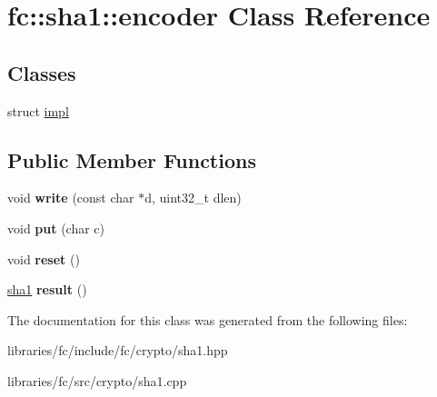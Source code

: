 \hypertarget{classfc_1_1sha1_1_1encoder}{}\section{fc\+:\+:sha1\+:\+:encoder Class Reference}
\label{classfc_1_1sha1_1_1encoder}
\subsection*{Classes}
\begin{DoxyCompactItemize}
\item 
struct \mbox{\hyperlink{structfc_1_1sha1_1_1encoder_1_1impl}{impl}}
\end{DoxyCompactItemize}
\subsection*{Public Member Functions}
\begin{DoxyCompactItemize}
\item 
\mbox{\label{classfc_1_1sha1_1_1encoder_a3fe2406bfa6f78ce37482c742a697601}} 
void {\bfseries write} (const char $\ast$d, uint32\+\_\+t dlen)
\item 
\mbox{\label{classfc_1_1sha1_1_1encoder_a6f1fc5ccfa1c4f484f0bf2edeaa027b2}} 
void {\bfseries put} (char c)
\item 
\mbox{\label{classfc_1_1sha1_1_1encoder_a22e2c6649fae5316337ccd1836779aaf}} 
void {\bfseries reset} ()
\item 
\mbox{\label{classfc_1_1sha1_1_1encoder_ad17eb3cf6315b803ba7d73edd704d44c}} 
\mbox{\hyperlink{classfc_1_1sha1}{sha1}} {\bfseries result} ()
\end{DoxyCompactItemize}


The documentation for this class was generated from the following files\+:\begin{DoxyCompactItemize}
\item 
libraries/fc/include/fc/crypto/sha1.\+hpp\item 
libraries/fc/src/crypto/sha1.\+cpp\end{DoxyCompactItemize}
